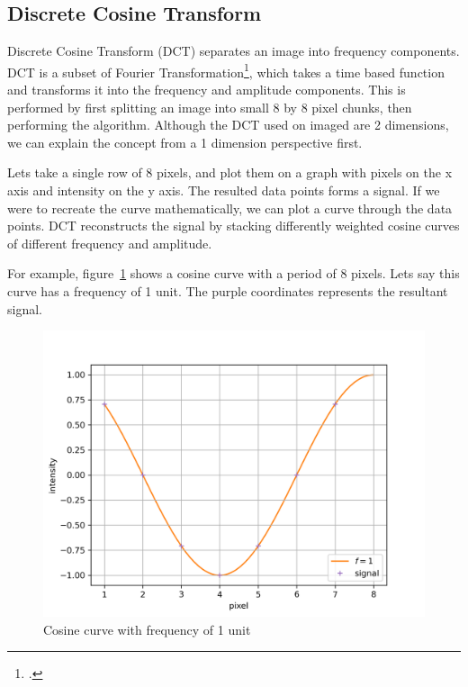 \documentclass{article}
\begin{document}

\subsection{Discrete Cosine Transform}\label{dct}
Discrete Cosine Transform (DCT) separates an image into frequency components.
DCT is a subset of Fourier Transformation\footcite{dctYT}, which takes a time based function and transforms it into the frequency and amplitude components.
This is performed by first splitting an image into small 8 by 8 pixel chunks, then performing the algorithm.
Although the DCT used on imaged are 2 dimensions, we can explain the concept from a 1 dimension perspective first.

Lets take a single row of 8 pixels, and plot them on a graph with pixels on the x axis and intensity on the y axis.
The resulted data points forms a signal.
If we were to recreate the curve mathematically, we can plot a curve through the data points.
DCT reconstructs the signal by stacking differently weighted cosine curves of different frequency and amplitude.

For example, figure~\ref{fig:cos1} shows a cosine curve with a period of 8 pixels.
Lets say this curve has a frequency of 1 unit.
The purple coordinates represents the resultant signal.
\begin{figure}[h]
	\centering
	\includegraphics[width=\textwidth]{./figures/dct/cos1}
	\caption{Cosine curve with frequency of 1 unit}
	\label{fig:cos1}
\end{figure}
\end{document}
